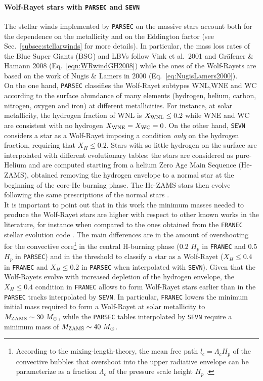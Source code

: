\documentclass[a4paper,titlepage]{book}     	%
\newcommand{\sun}{\ensuremath{_\odot}}
\newcommand{\mzams}{M_\textup{ZAMS}}
\newcommand{\msun}{\ensuremath{M\sun}}
\begin{document}
\paragraph{Wolf-Rayet stars with \texttt{PARSEC} and \texttt{SEVN}} The stellar winds implemented by \texttt{PARSEC} on the massive stars account both for the dependence on the metallicity and on the Eddington factor (see Sec.\ \ref{subsec:stellarwinds} for more details). In particular, the mass loss rates of the Blue Super Giants (BSG) and LBVs follow Vink et al.\ 2001 and Gr{\"a}fener \& Hamann 2008 (Eq.\ \ref{eqn:WRwindGH2008}) while the ones of the Wolf-Rayets are based on the work of Nugis \& Lamers in 2000 (Eq.\ \ref{eq:NugisLamers2000}).\\

On the one hand, \texttt{PARSEC} classifies the Wolf-Rayet subtypes WNL,WNE and WC according to the surface abundance of many elements (hydrogen, helium, carbon, nitrogen, oxygen and iron) at different metallicities. For instance, at solar metallicity, the hydrogen fraction of WNL is $X_{\rm WNL} \leq 0.2$ while WNE and WC are consistent with no hydrogen $X_{\rm WNE} = X_{\rm WC} = 0$. On the other hand, \texttt{SEVN} considers a star as a Wolf-Rayet imposing a condition \emph{only} on the hydrogen fraction, requiring that $X_H \leq 0.2$. Stars with so little hydrogen on the surface are interpolated with different evolutionary tables: the stars are considered as pure-Helium and are computed starting from a helium Zero Age Main Sequence (He-ZAMS), obtained removing the hydrogen envelope to a normal star at the beginning of the core-He burning phase. The He-ZAMS stars then evolve following the same prescriptions of the normal stars \cite{spera2019_mergingBBH}.\\

It is important to point out that in this work the minimum masses needed to produce the Wolf-Rayet stars are higher with respect to other known works in the literature, for instance when compared to the ones obtained from the \texttt{FRANEC} stellar evolution code \cite{Limongi2010_preSNevo}. The main differences are in the amount of overshooting for the convective core\footnote{According to the mixing-length-theory, the mean free path $l_c = \Lambda_c H_p$ of the convective bubbles that overshoot into the upper radiative envelope can be parameterize as a fraction $\Lambda_c$ of the pressure scale height $H_p$ \cite{parsec2015_chen}.} in the central H-burning phase (0.2 $H_p$ in \texttt{FRANEC} and 0.5 $H_p$ in \texttt{PARSEC}) and in the threshold to classify a star as a Wolf-Rayet ($X_H \leq 0.4$ in \texttt{FRANEC} and $X_H \leq 0.2$ in \texttt{PARSEC} when interpolated with \texttt{SEVN}). Given that the Wolf-Rayets evolve with increased depletion of the hydrogen envelope, the $X_H \leq 0.4$ condition in \texttt{FRANEC} allows to form Wolf-Rayet stars earlier than in the \texttt{PARSEC} tracks interpolated by \texttt{SEVN}. In particular, \texttt{FRANEC} lowers the minimum initial mass required to form a Wolf-Rayet at solar metallicity to $\mzams \sim 30~\msun$, while the \texttt{PARSEC} tables interpolated by \texttt{SEVN} require a minimum mass of $\mzams \sim 40~\msun$. 
\end{document}
